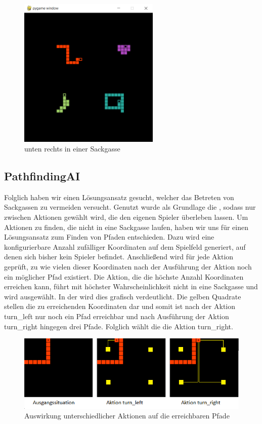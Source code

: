 \begin{figure}[htb]
    \centering
    \includegraphics[width=0.6\textwidth]{Bilder/Sackgassen_Problem.png}
    \caption{ unten rechts in einer Sackgasse}
    \label{fig:Sackgassen-Problem}
\end{figure}

\subsection{PathfindingAI}
\label{subsec:pathfinding-ai}

Folglich haben wir einen Lösungsansatz gesucht, welcher das Betreten von Sackgassen zu vermeiden versucht.
Genutzt wurde als Grundlage die , sodass nur zwischen Aktionen gewählt wird, die den eigenen
Spieler überleben lassen.
Um Aktionen zu finden, die nicht in eine Sackgasse laufen, haben wir uns für einen Lösungsansatz zum Finden von
Pfaden entschieden.
Dazu wird eine konfigurierbare Anzahl zufälliger Koordinaten auf dem Spielfeld generiert, auf denen sich bisher kein
Spieler befindet.
Anschließend wird für jede Aktion geprüft, zu wie vielen dieser Koordinaten nach der Ausführung der Aktion noch ein
möglicher Pfad existiert.
Die Aktion, die die höchste Anzahl Koordinaten erreichen kann, führt mit höchster Wahrscheinlichkeit
nicht in eine Sackgasse und wird ausgewählt.
In der  wird dies grafisch verdeutlicht.
Die gelben Quadrate stellen die zu erreichenden Koordinaten dar und somit ist nach der Aktion turn\_left nur noch ein
Pfad erreichbar und nach Ausführung der Aktion turn\_right hingegen drei Pfade.
Folglich wählt die  die Aktion turn\_right.

\begin{figure}[htb]
    \centering
    \includegraphics{Bilder/pathfinding_example.png}
    \caption{Auswirkung unterschiedlicher Aktionen auf die erreichbaren Pfade}
    \label{fig:sackgasse-pfade}
\end{figure}

